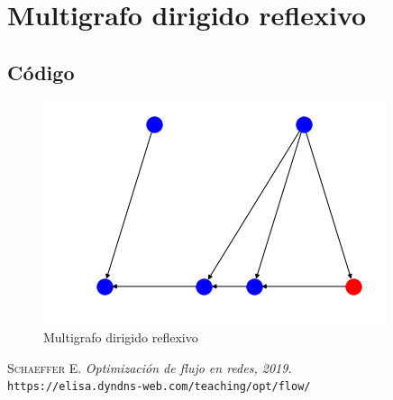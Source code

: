 \documentclass[10pt,a4paper]{article}
\begin{document}
\section{Multigrafo dirigido reflexivo}
\subsection{Código}
\begin{figure}[H]
\centering
\includegraphics[scale=.5]{multigrafodirigidoreflexivo}
\caption{Multigrafo dirigido reflexivo}
\end{figure}

\newpage
\begin{thebibliography}{X}
 \textsc{Schaeffer E.} \textit{Optimización de flujo en redes, 2019.} \\
\texttt{https://elisa.dyndns-web.com/teaching/opt/flow/ }

\end{thebibliography}
\end{document}
